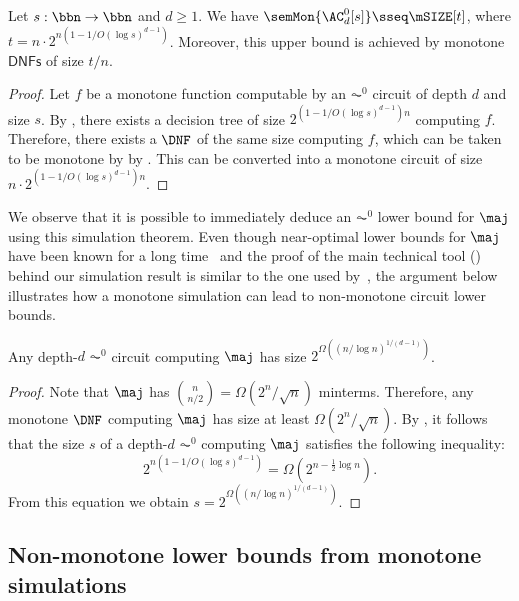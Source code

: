 \documentclass[11pt]{article}
\begin{document}
\begin{theorem}
    \label{thm:ros-dt-mdnf-intro}
    Let $s : \bbn \to \bbn$ and $d \geq 1$.
    We have
    $\semMon{\AC^0_d[s]} 
    \sseq 
    \mSIZE[t]$, 
    where
    $t = n \cdot 2^{n(1-{1/O(\log s)^{d-1}})}$.
    Moreover, this upper bound is achieved by monotone $\mathsf{DNFs}$ of 
    size $t/n$.
\end{theorem}
\begin{proof}
    Let $f$ be a monotone function
    computable
    by an $\AC^0$ circuit of depth
    $d$ and size $s$.
    By ,
    there exists a decision tree of size
    $2^{(1-{1/O(\log s)^{d-1}})n}$
    computing $f$.
    Therefore, there exists a $\DNF$ of the same size
    computing $f$,
    which can be taken to be monotone by
    by .
    This can be converted into a monotone circuit of size
    $n \cdot 2^{(1-{1/O(\log s)^{d-1}})n}$.
\end{proof}

We observe that it is possible to immediately deduce an $\AC^0$ lower bound
for $\maj$ using this simulation theorem.
Even though near-optimal lower bounds for $\maj$
have been known for a long time~\cite{DBLP:conf/stoc/Hastad86} 
and the proof of the main technical tool () behind our simulation result is
similar to the one used by~\cite{DBLP:conf/stoc/Hastad86},
the argument below illustrates how a monotone simulation can lead to non-monotone circuit lower bounds.

\begin{corollary}
    \label{cor:maj-lb}
    Any depth-$d$ $\AC^0$ circuit computing $\maj$
    has size $2^{\Omega((n/\log n)^{1/(d-1)})}$.
\end{corollary}
\begin{proof}
    Note that $\maj$ has $\binom{n}{n/2} = \Omega(2^n/\sqrt{n})$ minterms.
    Therefore, any monotone $\DNF$ computing $\maj$ has
    size at least $\Omega(2^n/\sqrt{n})$.
    By , it follows that the size $s$ of a depth-$d$
    $\AC^0$ computing $\maj$ satisfies the following inequality:
    \begin{equation*}
        2^{n(1-{1/O(\log s)^{d-1}})}
        =
        \Omega(2^{n-\frac{1}{2}\log n}).
    \end{equation*}
    From this equation we obtain
    $s = 2^{\Omega((n/\log n)^{1/(d-1)})}$.
\end{proof}




\subsection{Non-monotone lower bounds
from monotone simulations}
\end{document}
